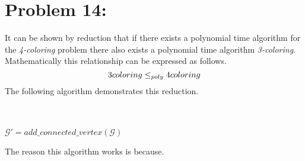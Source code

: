 \documentclass[12pt]{article}
\begin{document}
\section*{Problem 14:}
It can be shown by reduction that if there exists a polynomial time algorithm
for the \textit{4-coloring} problem there also exists a polynomial time algorithm
\textit{3-coloring}.  Mathematically this relationship can be expressed as follows.
\[
3\-coloring \leq_{poly} 4\-coloring
\]
The following algorithm demonstrates this reduction.\\
\begin{algorithm}[H]
\\
\\
$\mathcal{G'}=add\_connected\_vertex(\mathcal{G})$\\
\end{algorithm}
The reason this algorithm works is because.
\end{document}
